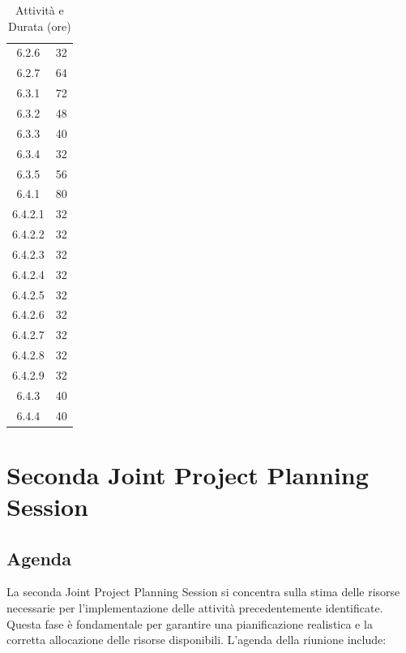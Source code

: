 \begin{table}[H]
\begin{tabular}{|c|c|}
        6.2.6             & 32                    \\
        6.2.7             & 64                    \\
        6.3.1             & 72                    \\
        6.3.2             & 48                    \\
        6.3.3             & 40                    \\
        6.3.4             & 32                    \\
        6.3.5             & 56                    \\
        6.4.1             & 80                    \\
        6.4.2.1           & 32                    \\
        6.4.2.2           & 32                    \\
        6.4.2.3           & 32                    \\
        6.4.2.4           & 32                    \\
        6.4.2.5           & 32                    \\
        6.4.2.6           & 32                    \\
        6.4.2.7           & 32                    \\
        6.4.2.8           & 32                    \\
        6.4.2.9           & 32                    \\
        6.4.3             & 40                    \\
        6.4.4             & 40                    \\
        \hline
    \end{tabular}
    \caption{Attività e Durata (ore)}
    \label{tab:attivita-durata}
\end{table}

\section{Seconda Joint Project Planning Session}

\subsection{Agenda}

La seconda Joint Project Planning Session si concentra sulla stima delle risorse necessarie per l'implementazione delle attività precedentemente identificate. Questa fase è fondamentale per garantire una pianificazione realistica e la corretta allocazione delle risorse disponibili. L'agenda della riunione include:

